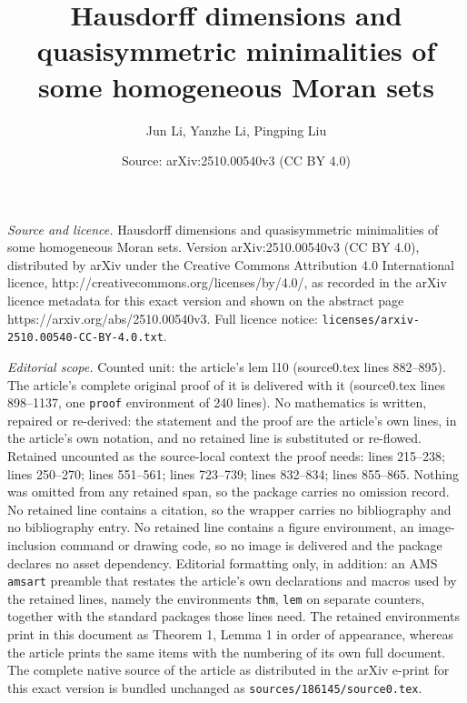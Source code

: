 \documentclass[10pt,a4paper]{amsart}
\title{Hausdorff dimensions and quasisymmetric minimalities of some homogeneous Moran sets}
\author{Jun Li, Yanzhe Li, Pingping Liu}
\date{Source: arXiv:2510.00540v3 (CC BY 4.0)}
\begin{document}
\maketitle

\noindent\emph{Source and licence.} Hausdorff dimensions and quasisymmetric minimalities of some homogeneous Moran sets. Version arXiv:2510.00540v3 (CC BY 4.0), distributed by arXiv under the Creative Commons Attribution 4.0 International licence, http://creativecommons.org/licenses/by/4.0/, as recorded in the arXiv licence metadata for this exact version and shown on the abstract page https://arxiv.org/abs/2510.00540v3. Full licence notice: \texttt{licenses/arxiv-2510.00540-CC-BY-4.0.txt}.\par\smallskip

\noindent\textit{Editorial scope.} Counted unit: the article's lem l10 (source0.tex lines 882--895). The article's complete original proof of it is delivered with it (source0.tex lines 898--1137, one \texttt{proof} environment of 240 lines). No mathematics is written, repaired or re-derived: the statement and the proof are the article's own lines, in the article's own notation, and no retained line is substituted or re-flowed.  Retained uncounted as the source-local context the proof needs: lines 215--238; lines 250--270; lines 551--561; lines 723--739; lines 832--834; lines 855--865.  Nothing was omitted from any retained span, so the package carries no omission record.  No retained line contains a citation, so the wrapper carries no bibliography and no bibliography entry.  No retained line contains a figure environment, an image-inclusion command or drawing code, so no image is delivered and the package declares no asset dependency.  Editorial formatting only, in addition: an AMS \texttt{amsart} preamble that restates the article's own declarations and macros used by the retained lines, namely the environments \texttt{thm}, \texttt{lem} on separate counters, together with the standard packages those lines need.  The retained environments print in this document as Theorem 1, Lemma 1 in order of appearance, whereas the article prints the same items with the numbering of its own full document.  The complete native source of the article as distributed in the arXiv e-print for this exact version is bundled unchanged as \texttt{sources/186145/source0.tex}.
\end{document}
